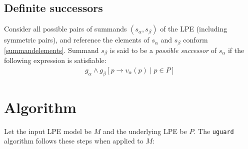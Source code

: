 \subsection{Definite successors}

Consider all possible pairs of summands $(s_\alpha, s_\beta)$ of the LPE (including symmetric pairs), and reference the elements of $s_\alpha$ and $s_\beta$ conform \ref{summandelements}.
Summand $s_\beta$ is said to be a \emph{possible successor} of $s_\alpha$ if the following expression is satisfiable:
\begin{align*}
g_\alpha \land {g_\beta}[p \rightarrow v_\alpha(p) \;|\; p \in P]
\end{align*}

\section{Algorithm}

Let the input LPE model be $M$ and the underlying LPE be $P$.
The \texttt{uguard} algorithm follows these steps when applied to $M$:

